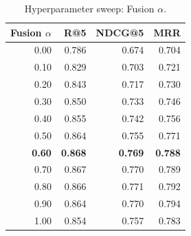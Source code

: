 \begin{table}[t]
\centering
\caption{Hyperparameter sweep: Fusion $\alpha$.}
\label{tab:sweep-fusion-$\alpha$}
\begin{tabular}{rrrr}
\toprule
Fusion $\alpha$ & R@5 & NDCG@5 & MRR \\
\midrule
0.00 & 0.786 & 0.674 & 0.704 \\
0.10 & 0.829 & 0.703 & 0.721 \\
0.20 & 0.843 & 0.717 & 0.730 \\
0.30 & 0.850 & 0.733 & 0.746 \\
0.40 & 0.855 & 0.742 & 0.756 \\
0.50 & 0.864 & 0.755 & 0.771 \\
\textbf{0.60} & \textbf{0.868} & \textbf{0.769} & \textbf{0.788} \\
0.70 & 0.867 & 0.770 & 0.789 \\
0.80 & 0.866 & 0.771 & 0.792 \\
0.90 & 0.864 & 0.770 & 0.794 \\
1.00 & 0.854 & 0.757 & 0.783 \\
\bottomrule
\end{tabular}
\end{table}